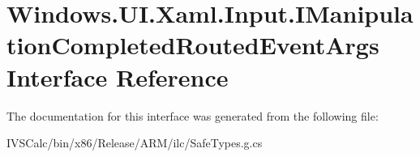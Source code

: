 \hypertarget{interface_windows_1_1_u_i_1_1_xaml_1_1_input_1_1_i_manipulation_completed_routed_event_args}{}\section{Windows.\+U\+I.\+Xaml.\+Input.\+I\+Manipulation\+Completed\+Routed\+Event\+Args Interface Reference}
\label{interface_windows_1_1_u_i_1_1_xaml_1_1_input_1_1_i_manipulation_completed_routed_event_args}


The documentation for this interface was generated from the following file\+:\begin{DoxyCompactItemize}
\item 
I\+V\+S\+Calc/bin/x86/\+Release/\+A\+R\+M/ilc/Safe\+Types.\+g.\+cs\end{DoxyCompactItemize}
